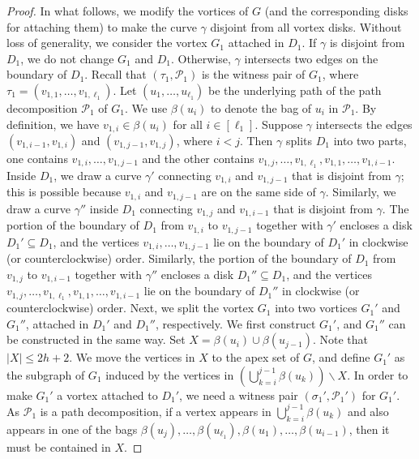 \documentclass[a4paper,11pt]{article}
\numberwithin{lemma}{section}
\begin{document}
\begin{proof}
In what follows, we modify the vortices of $G$ (and the corresponding disks for attaching them) to make the curve $\gamma$ disjoint from all vortex disks.
Without loss of generality, we consider the vortex $G_1$ attached in $D_1$.
If $\gamma$ is disjoint from $D_1$, we do not change $G_1$ and $D_1$.
Otherwise, $\gamma$ intersects two edges on the boundary of $D_1$.
Recall that $(\tau_1,\mathcal{P}_1)$ is the witness pair of $G_1$, where $\tau_1 = (v_{1,1},\dots,v_{1,\ell_1})$.
Let $(u_1,\dots,u_{\ell_1})$ be the underlying path of the path decomposition $\mathcal{P}_1$ of $G_1$.
We use $\beta(u_i)$ to denote the bag of $u_i$ in $\mathcal{P}_1$.
By definition, we have $v_{1,i} \in \beta(u_i)$ for all $i \in [\ell_1]$.
Suppose $\gamma$ intersects the edges $(v_{1,i-1},v_{1,i})$ and $(v_{1,j-1},v_{1,j})$, where $i<j$.
Then $\gamma$ splits $D_1$ into two parts, one contains $v_{1,i},\dots,v_{1,j-1}$ and the other contains $v_{1,j},\dots,v_{1,\ell_1},v_{1,1},\dots,v_{1,i-1}$.
Inside $D_1$, we draw a curve $\gamma'$ connecting $v_{1,i}$ and $v_{1,j-1}$ that is disjoint from $\gamma$; this is possible because $v_{1,i}$ and $v_{1,j-1}$ are on the same side of $\gamma$.
Similarly, we draw a curve $\gamma''$ inside $D_1$ connecting $v_{1,j}$ and $v_{1,i-1}$ that is disjoint from $\gamma$.
The portion of the boundary of $D_1$ from $v_{1,i}$ to $v_{1,j-1}$ together with $\gamma'$ encloses a disk $D_1' \subseteq D_1$, and the vertices $v_{1,i},\dots,v_{1,j-1}$ lie on the boundary of $D_1'$ in clockwise (or counterclockwise) order.
Similarly, the portion of the boundary of $D_1$ from $v_{1,j}$ to $v_{1,i-1}$ together with $\gamma''$ encloses a disk $D_1'' \subseteq D_1$, and the vertices $v_{1,j},\dots,v_{1,\ell_1},v_{1,1},\dots,v_{1,i-1}$ lie on the boundary of $D_1''$ in clockwise (or counterclockwise) order.
Next, we split the vortex $G_1$ into two vortices $G_1'$ and $G_1''$, attached in $D_1'$ and $D_1''$, respectively.
We first construct $G_1'$, and $G_1''$ can be constructed in the same way.
Set $X = \beta(u_i) \cup \beta(u_{j-1})$.
Note that $|X| \leq 2h+2$.
We move the vertices in $X$ to the apex set of $G$, and define $G_1'$ as the subgraph of $G_1$ induced by the vertices in $(\bigcup_{k=i}^{j-1} \beta(u_k)) \backslash X$.
In order to make $G_1'$ a vortex attached to $D_1'$, we need a witness pair $(\sigma_1',\mathcal{P}_1')$ for $G_1'$.
As $\mathcal{P}_1$ is a path decomposition, if a vertex appears in $\bigcup_{k=i}^{j-1} \beta(u_k)$ and also appears in one of the bags $\beta(u_j),\dots,\beta(u_{\ell_1}),\beta(u_1),\dots,\beta(u_{i-1})$, then it must be contained in $X$.

\end{proof}
\end{document}
